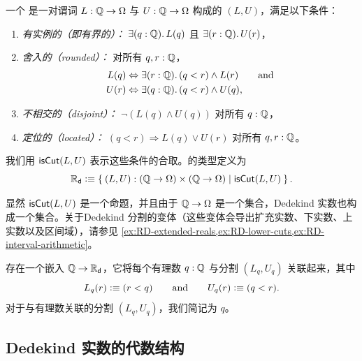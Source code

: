 \begin{defn} \label{defn:dedekind-reals}
  一个 
  是一对谓词 $L : \mathbb{Q} \to \Omega$ 与 $U : \mathbb{Q} \to \Omega$ 构成的 $(L, U)$，满足以下条件：
  \begin{enumerate}
  \item \label{defn:dedekind-reals-inhabited}
    \emph{有实例的（即有界的）：} $\exis{q : \Q} L(q)$ 且 $\exis{r : \Q} U(r)$，
  \item \emph{舍入的（rounded）：} 对所有 $q, r : \mathbb{Q}$，
    \begin{align*}
      L(q) &\Leftrightarrow \exis{r : \Q} (q < r) \land L(r)
      \qquad\text{and}\\
      U(r) &\Leftrightarrow \exis{q : \Q} (q < r) \land U(q),
    \end{align*}
  \item \emph{不相交的（disjoint）：} $\lnot (L(q) \land U(q))$ 对所有 $q : \mathbb{Q}$，
  \item \emph{定位的（located）：} $(q < r) \Rightarrow L(q) \lor U(r)$ 对所有 $q, r : \mathbb{Q}$。
  \end{enumerate}
  我们用 $\mathsf{isCut}(L, U)$ 表示这些条件的合取。的类型定义为
  \begin{equation*}
    \RD \defeq \setof{ (L, U) : (\Q \to \Omega) \times (\Q \to \Omega) | \dcut(L,U)}.
  \end{equation*}
\end{defn}

显然 $\mathsf{isCut}(L, U)$ 是一个命题，并且由于 $\mathbb{Q} \to \Omega$ 是一个集合，Dedekind 实数也构成一个集合。关于Dedekind 分割的变体（这些变体会导出扩充实数、下实数、上实数以及区间域），请参见
\cref{ex:RD-extended-reals,ex:RD-lower-cuts,ex:RD-interval-arithmetic}。

存在一个嵌入 $\mathbb{Q} \to \mathbb{R}_\mathsf{d}$，它将每个有理数 $q : \mathbb{Q}$ 与分割 $(L_q, U_q)$ 关联起来，其中
%
\begin{equation*}
  L_q(r) \vcentcolon\equiv (r < q)
  \qquad\text{and}\qquad
  U_q(r) \vcentcolon\equiv (q < r).
\end{equation*}
%
对于与有理数关联的分割 $(L_q, U_q)$，我们简记为 $q$。

\subsection{Dedekind 实数的代数结构}
\label{sec:algebr-struct-dedek}

